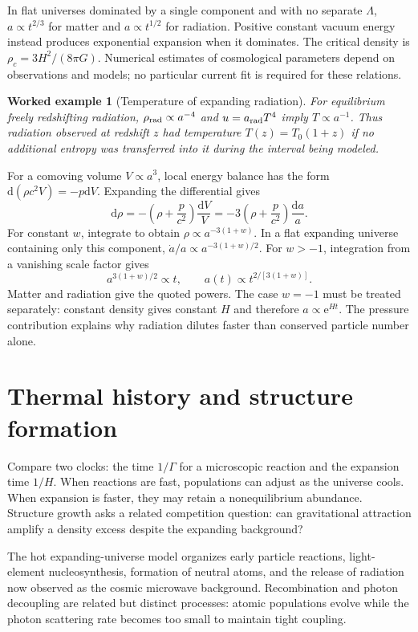 \documentclass[11pt,oneside]{book}
\newcommand{\dd}{\mathrm{d}}
\newcommand{\ee}{\mathrm{e}}
\theoremstyle{reviewstyle}
\newtheorem{example}{Worked example}[chapter]
\begin{document}
In flat universes dominated by a single component and with no separate $\Lambda$, $a\propto t^{2/3}$ for matter and $a\propto t^{1/2}$ for radiation. Positive constant vacuum energy instead produces exponential expansion when it dominates. The critical density is $\rho_c=3H^2/(8\pi G)$. Numerical estimates of cosmological parameters depend on observations and models; no particular current fit is required for these relations.
\begin{example}[Temperature of expanding radiation]
For equilibrium freely redshifting radiation, $\rho_{\rm rad}\propto a^{-4}$ and $u=a_{\rm rad}T^4$ imply $T\propto a^{-1}$. Thus radiation observed at redshift $z$ had temperature $T(z)=T_0(1+z)$ if no additional entropy was transferred into it during the interval being modeled.
\end{example}

For a comoving volume $V\propto a^3$, local energy balance has the form $\dd(\rho c^2V)=-p\dd V$. Expanding the differential gives
\begin{equation}
\dd\rho=-\left(\rho+\frac p{c^2}\right)\frac{\dd V}{V}
=-3\left(\rho+\frac p{c^2}\right)\frac{\dd a}{a}.
\end{equation}
For constant $w$, integrate to obtain $\rho\propto a^{-3(1+w)}$. In a flat expanding universe containing only this component, $\dot a/a\propto a^{-3(1+w)/2}$. For $w>-1$, integration from a vanishing scale factor gives
\begin{equation}
a^{3(1+w)/2}\propto t,
\qquad a(t)\propto t^{2/[3(1+w)]}.
\end{equation}
Matter and radiation give the quoted powers. The case $w=-1$ must be treated separately: constant density gives constant $H$ and therefore $a\propto\ee^{Ht}$. The pressure contribution explains why radiation dilutes faster than conserved particle number alone.

\section{Thermal history and structure formation}
Compare two clocks: the time $1/\Gamma$ for a microscopic reaction and the expansion time $1/H$. When reactions are fast, populations can adjust as the universe cools. When expansion is faster, they may retain a nonequilibrium abundance. Structure growth asks a related competition question: can gravitational attraction amplify a density excess despite the expanding background?

The hot expanding-universe model organizes early particle reactions, light-element nucleosynthesis, formation of neutral atoms, and the release of radiation now observed as the cosmic microwave background. Recombination and photon decoupling are related but distinct processes: atomic populations evolve while the photon scattering rate becomes too small to maintain tight coupling.
\end{document}
